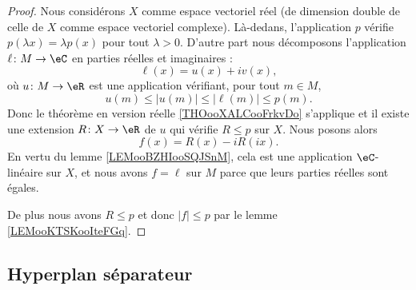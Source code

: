 \begin{proof}
	Nous considérons \( X\) comme espace vectoriel réel (de dimension double de celle de \( X\) comme espace vectoriel complexe). Là-dedans, l'application \( p\) vérifie \( p(\lambda x)=\lambda p(x)\) pour tout \( \lambda>0\). D'autre part nous décomposons l'application \(\ell \colon M\to \eC  \) en parties réelles et imaginaires :
	\begin{equation}
		\ell(x)=u(x)+iv(x),
	\end{equation}
	où \(u \colon M\to \eR  \) est une application vérifiant, pour tout \( m\in M\),
	\begin{equation}
		u(m)\leq | u(m) |\leq | \ell(m) |\leq p(m).
	\end{equation}
	Donc le théorème en version réelle \ref{THOooXALCooFrkvDo} s'applique et il existe une extension \(R \colon X\to \eR  \) de \( u\) qui vérifie \( R\leq p\) sur \( X\). Nous posons alors
	\begin{equation}
		f(x)=R(x)-iR(ix).
	\end{equation}
	En vertu du lemme \ref{LEMooBZHIooSQJSnM}, cela est une application \( \eC\)-linéaire sur \( X\), et nous avons \( f=\ell\) sur \( M\) parce que leurs parties réelles sont égales.

	De plus nous avons \( R\leq p\) et donc \( | f |\leq p\) par le lemme \ref{LEMooKTSKooIteFGq}.
\end{proof}

\subsection{Hyperplan séparateur}


